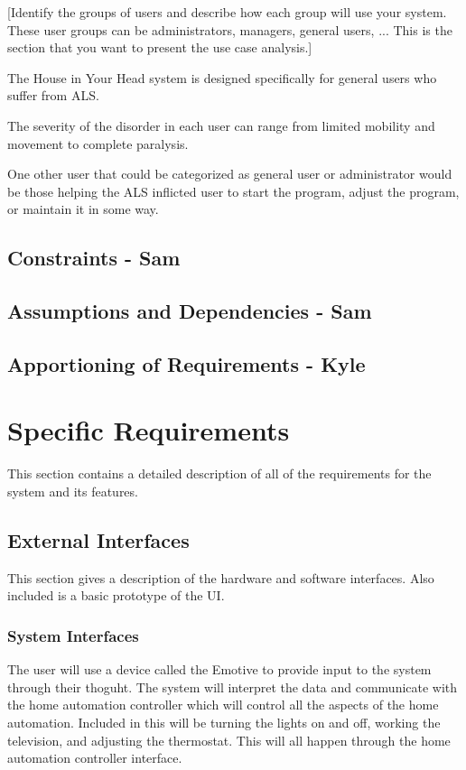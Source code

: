 \documentclass{report}
\begin{document}
[Identify the groups of users and describe how each group will use your system. These user groups
can be administrators, managers, general users, ... This is the section that you want to present the use 
case analysis.]

The House in Your Head system is designed specifically for general users who suffer from ALS. 

The severity of the disorder in each user can range from limited mobility and movement to complete 
paralysis. 

One other user that could be categorized as general user or administrator would be those helping the 
ALS inflicted user to start the program, adjust the program, or maintain it in some way.

\subsection{Constraints - Sam}

\subsection{Assumptions and Dependencies - Sam}

\subsection{Apportioning of Requirements - Kyle}

\newpage

\section{Specific Requirements}
This section contains a detailed description of all of the requirements for the system and its features. 

\subsection{External Interfaces}
This section gives a description of the hardware and software interfaces. Also included is a basic prototype of the UI.

\subsubsection{System Interfaces}

The user will use a device called the Emotive to provide input to the system through their thoguht. The system will interpret the data and communicate with the home automation controller which will control all the aspects of the home automation. Included in this will be turning the lights on and off, working the television, and adjusting the thermostat. This will all happen through the home automation controller interface.
\end{document}

